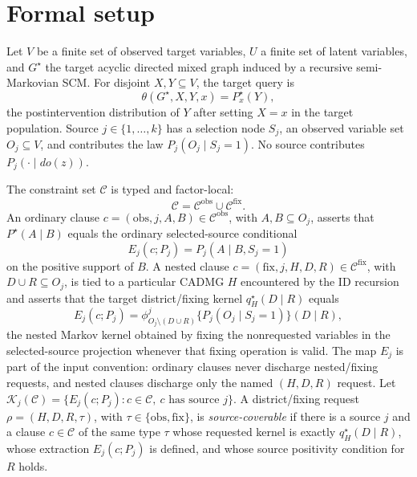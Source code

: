 \documentclass[11pt]{article}
\theoremstyle{definition}
\theoremstyle{plain}
\theoremstyle{remark}
\begin{document}
\section{Formal setup}
Let \(V\) be a finite set of observed target variables, \(U\) a finite set of
latent variables, and \(G^\star\) the target acyclic directed mixed graph
induced by a recursive semi-Markovian SCM.  For disjoint \(X,Y\subseteq V\),
the target query is
\[
  \theta(G^\star,X,Y,x)=P^\star_x(Y),
\]
the postintervention distribution of \(Y\) after setting \(X=x\) in the
target population.  Source \(j\in\{1,\ldots,k\}\) has a selection node \(S_j\),
an observed variable set \(O_j\subseteq V\), and contributes the law
\(P_j(O_j\mid S_j=1)\).  No source contributes \(P_j(\cdot\mid do(z))\).

The constraint set \(\mathcal C\) is typed and factor-local:
\[
  \mathcal C=\mathcal C^{\mathrm{obs}}\cup\mathcal C^{\mathrm{fix}}.
\]
An ordinary clause \(c=(\mathrm{obs},j,A,B)\in\mathcal C^{\mathrm{obs}}\),
with \(A,B\subseteq O_j\), asserts that \(P^\star(A\mid B)\) equals the
ordinary selected-source conditional
\[
  E_j(c;P_j)=P_j(A\mid B,S_j=1)
\]
on the positive support of \(B\).  A nested clause
\(c=(\mathrm{fix},j,H,D,R)\in\mathcal C^{\mathrm{fix}}\), with
\(D\cup R\subseteq O_j\), is tied to a particular CADMG \(H\) encountered by
the ID recursion and asserts that the target district/fixing kernel
\(q^\star_H(D\mid R)\) equals
\[
  E_j(c;P_j)=\phi^{j}_{O_j\setminus(D\cup R)}
    \{P_j(O_j\mid S_j=1)\}(D\mid R),
\]
the nested Markov kernel obtained by fixing the nonrequested variables in the
selected-source projection whenever that fixing operation is valid.  The map
\(E_j\) is part of the input convention: ordinary clauses never discharge
nested/fixing requests, and nested clauses discharge only the named
\((H,D,R)\) request.  Let \(\mathcal K_j(\mathcal C)=\{E_j(c;P_j):
c\in\mathcal C,\ c\text{ has source }j\}\).  A district/fixing request
\(\rho=(H,D,R,\tau)\), with \(\tau\in\{\mathrm{obs},\mathrm{fix}\}\), is
\emph{source-coverable} if there is a source \(j\) and a clause \(c\in
\mathcal C\) of the same type \(\tau\) whose requested kernel is exactly
\(q^\star_H(D\mid R)\), whose extraction \(E_j(c;P_j)\) is defined, and whose
source positivity condition for \(R\) holds.
\end{document}
